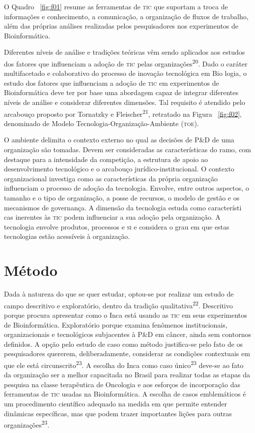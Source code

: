 \documentclass{article}
\begin{document}
O Quadro ~\ref{fig:f01}
resume as ferramentas de \textsc{tic} que suportam a troca de informações e conhecimento,
a comunicação, a organização de fluxos de trabalho, além das próprias análises
realizadas pelos pesquisadores nos experimentos de Bioinformática.

Diferentes níveis de análise e tradições teóricas vêm sendo aplicados aos
estudos dos fatores que influenciam a adoção de \textsc{tic} pelas
organizações\textsuperscript{20}. Dado o caráter multifacetado e colaborativo do processo de inovação
tecnológica em Bio logia, o estudo dos fatores que influenciam a adoção de \textsc{tic}
em experimentos de Bioinformática deve ter por base uma abordagem capaz de
integrar diferentes níveis de análise e considerar diferentes dimensões. Tal
requisito é atendido pelo arcabouço proposto por Tornatzky e
Fleischer\textsuperscript{21}, retratado na Figura ~\ref{fig:f02}, denominado de Modelo Tecnologia-Organização-Ambiente (\textsc{toe}).

O ambiente delimita o contexto externo no qual as decisões de P\&D de uma
organização são tomadas. Devem ser consideradas as características do ramo, com
destaque para a intensidade da competição, a estrutura de apoio ao
desenvolvimento tecnológico e o arcabouço jurídico-institucional. O contexto
organizacional investiga como as características da própria organização
influenciam o processo de adoção da tecnologia. Envolve, entre outros aspectos,
o tamanho e o tipo de organização, a posse de recursos, o modelo de gestão e os
mecanismos de governança. A dimensão da tecnologia estuda como característi cas
inerentes às \textsc{tic} podem influenciar a sua adoção pela organização. A tecnologia
envolve produtos, processos e \textsc{si} e considera o grau em que estas tecnologias
estão acessíveis à organização.

\section{Método}

Dada à natureza do que se quer estudar, optou-se por realizar um estudo de campo
descritivo e exploratório, dentro da tradição qualitativa\textsuperscript{22}. Descritivo porque procura apresentar como o Inca está usando as \textsc{tic} em seus
experimentos de Bioinformática. Exploratório porque examina fenômenos
institucionais, organizacionais e tecnológicos subjacentes à P\&D em câncer,
ainda sem contornos definidos. A opção pelo estudo de caso como método
justifica-se pelo fato de os pesquisadores quererem, deliberadamente, considerar
as condições contextuais em que ele está circunscrito\textsuperscript{23}. A escolha do Inca como caso único\textsuperscript{23}
deve-se ao fato da organização ser a melhor capacitada no Brasil para realizar
todas as etapas da pesquisa na classe terapêutica de Oncologia e aos esforços de
incorporação das ferramentas de \textsc{tic} usadas na Bioinformática. A escolha de casos
emblemáticos é um procedimento científico adequado na medida em que permite
entender dinâmicas específicas, mas que podem trazer importantes lições para
outras organizações\textsuperscript{23}.
\end{document}
